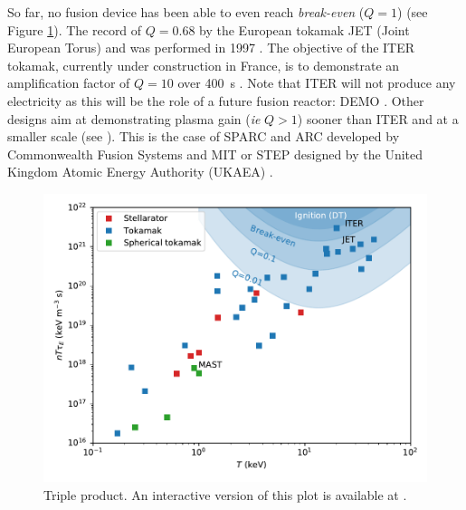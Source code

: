 So far, no fusion device has been able to even reach \textit{break-even} ($Q = 1$) (see Figure \ref{fig: triple product vs T}).
The record of $Q = 0.68$ by the European tokamak JET (Joint European Torus) and was performed in 1997 .
The objective of the ITER tokamak, currently under construction in France, is to demonstrate an amplification factor of $Q=10$ over \SI{400}{s} . 
Note that ITER will not produce any electricity as this will be the role of a future fusion reactor: DEMO .
Other designs aim at demonstrating plasma gain (\textit{ie} $Q > 1$) sooner than ITER and at a smaller scale (see ).
This is the case of SPARC and ARC developed by Commonwealth Fusion Systems and MIT  or STEP designed by the United Kingdom Atomic Energy Authority (UKAEA) .

\begin{figure}
    \centering
    \includegraphics[width=\linewidth]{Figures/Chapter1/triple_product_vs_T.pdf}
    \caption{Triple product. An interactive version of this plot is available at \cite{delaporte-mathurin_remdelaportemathurinfusion-world_2022}.}
    \label{fig: triple product vs T}
\end{figure}

